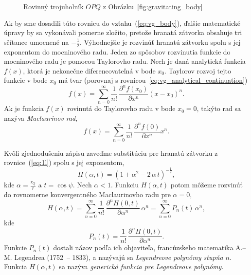 \documentclass[a4paper, 12pt]{book}
\begin{document}
\begin{figure}
\centering

\caption{Rovinný trojuholník $OPQ$ z Obrázku~\ref{fig:gravitating_body}}
\label{fig:distance_l}
\end{figure}

Ak by sme dosadili túto rovnicu do vzťahu~(\ref{eq:vg_body}), ďalšie 
matematické úpravy by sa vykonávali pomerne zložito, pretože hranatá zátvorka 
obsahuje tri sčítance umocnené na $-\frac{1}{2}$.  Výhodnejšie je rozvinúť 
hranatú zátvorku spolu s jej exponentom do mocninového radu.  Jeden zo spôsobov 
rozvinutia funkcie do mocninového radu je pomocou Taylorovho radu.  Nech je 
daná analytická funkcia $f(x)$, ktorá je nekonečne diferencovateľná v bode 
$x_0$.  Taylorov rozvoj tejto funkcie v bode $x_0$ má tvar (porovnaj 
s rovnicou~\ref{eq:vg_analytical_continuation})
%
\begin{equation}
f(x) = \sum_{n = 0}^\infty \frac{1}{n!} \, \frac{\partial^n f(x_0)}{\partial 
x^n} \left( x - x_0 \right)^n{.}
\end{equation}
%
Ak je funkcia $f(x)$ rovinutá do Taylorovho radu v bode $x_0 = 0$, takýto rad 
sa nazýva \emph{Maclaurinov rad},
%
\begin{equation}
f(x) = \sum_{n = 0}^\infty \frac{1}{n!} \, \frac{\partial^n f(0)}{\partial x^n} 
x^n{.}
\end{equation}

Kvôli zjednodušeniu zápisu zaveďme substitúciu pre hranatú zátvorku 
z rovnice~(\ref{eq:1l}) spolu s jej exponentom,
%
\begin{equation}
\label{eq:generic_function_for_lps}
H(\alpha, t) = \left(1 + \alpha^2 - 2 \, \alpha\, t \right)^{-\frac{1}{2}}{,}
\end{equation}
%
kde $\alpha = \frac{r_Q}{r}$ a $t = \cos\psi$.  Nech $\alpha < 1$.  Funkciu 
$H(\alpha, t)$ potom môžeme rozvinúť do rovnomerne konvergentného Maclaurinovho 
radu pre $\alpha = 0$,
%
\begin{equation}
\label{eq:maclaurin_series_of_generic_function}
H(\alpha, t) = \sum_{n = 0}^\infty \frac{1}{n!} \, \frac{\partial^n H(0, 
t)}{\partial \alpha^n} \, \alpha^n = \sum_{n = 0}^\infty P_n(t) \, \alpha^n{,}
\end{equation}
%
kde
%
\begin{equation}
\label{eq:pn}
P_n(t) = \frac{1}{n!} \, \frac{\partial^n H(0, t)}{\partial \alpha^n}{.}
\end{equation}
%
Funkcie $P_n(t)$ dostali názov podľa ich objaviteľa, francúzskeho matematika 
A.--M. Legendrea (1752~-- 1833), a nazývajú sa \emph{Legendreove polynómy 
stupňa $n$}.  Funkcia $H(\alpha, t)$ sa nazýva \emph{generická funkcia pre 
Legendreove polynómy}.
\end{document}
